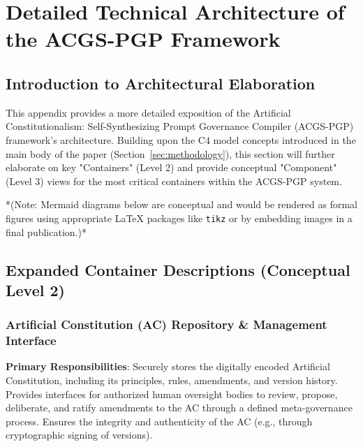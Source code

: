 \documentclass[sigconf,review,anonymous=false]{acmart} %
\begin{document}



\appendix

\section{Detailed Technical Architecture of the ACGS-PGP Framework}
\label{app:architecture}
\subsection{Introduction to Architectural Elaboration}
This appendix provides a more detailed exposition of the Artificial Constitutionalism: Self-Synthesizing Prompt Governance Compiler (ACGS-PGP) framework's architecture. Building upon the C4 model concepts introduced in the main body of the paper (Section~\ref{sec:methodology}), this section will further elaborate on key "Containers" (Level 2) and provide conceptual "Component" (Level 3) views for the most critical containers within the ACGS-PGP system.

*(Note: Mermaid diagrams below are conceptual and would be rendered as formal figures using appropriate LaTeX packages like \texttt{tikz} or by embedding images in a final publication.)*

\subsection{Expanded Container Descriptions (Conceptual Level 2)}
\label{app:architecture_details_containers}
\subsubsection{Artificial Constitution (AC) Repository \& Management Interface}
\label{app:architecture_details_ac_repo}
\textbf{Primary Responsibilities}: Securely stores the digitally encoded Artificial Constitution, including its principles, rules, amendments, and version history. Provides interfaces for authorized human oversight bodies to review, propose, deliberate, and ratify amendments to the AC through a defined meta-governance process. Ensures the integrity and authenticity of the AC (e.g., through cryptographic signing of versions).
\end{document}
